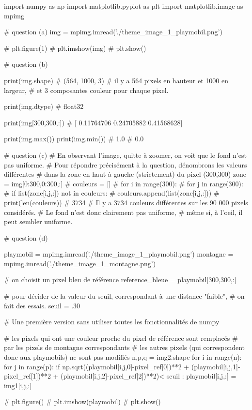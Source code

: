 \documentclass[10pt,fleqn]{article} %
\begin{document}
\begin{multicols}{2}
\begin{corrige}
\begin{python}
import numpy as np
import matplotlib.pyplot as plt
import matplotlib.image as mpimg

# question (a)
img = mpimg.imread('./theme_image_1_playmobil.png')  

# plt.figure(1)
# plt.imshow(img)
# plt.show()

# question (b)

print(img.shape)
# (564, 1000, 3)
# il y a 564 pixels en hauteur et 1000 en largeur,
# et 3 composantes couleur pour chaque pixel.
 
print(img.dtype)
# float32

print(img[300,300,:])
# [ 0.11764706  0.24705882  0.41568628]

print(img.max())
print(img.min())
# 1.0
# 0.0

# question (c)
# En observant l'image, quitte à zoomer, on voit que le fond n'est pas uniforme.
# Pour répondre précisément à la question, dénombrons les valeurs différentes
# dans la zone en haut à gauche (strictement) du pixel (300,300)
zone = img[0:300,0:300,:]
# couleurs = []
# for i in range(300):
#     for j in range(300):
#         if list(zone[i,j,:]) not in couleurs:
#             couleurs.append(list(zone[i,j,:]))
# print(len(couleurs))
# 3734
# Il y a 3734 couleurs différentes sur les 90 000 pixels considérés.
# Le fond n'est donc clairement pas uniforme,
# même si, à l'oeil, il peut sembler uniforme.

# question (d)

playmobil = mpimg.imread('./theme_image_1_playmobil.png')  
montagne = mpimg.imread('./theme_image_1_montagne.png')

# on choisit un pixel bleu de référence
reference_bleue = playmobil[300,300,:]

# pour décider de la valeur du seuil, correspondant à une distance "faible",
# on fait des essais. 
seuil = .30

# Une première version sans utiliser toutes les fonctionnalités de numpy

# les pixels qui ont une couleur proche du pixel de référence sont remplacés
# par les pixels de montagne correspondants
# les autres pixels (qui correspondent donc aux playmobils) ne sont pas modifiés
n,p,q = img2.shape
for i in range(n):
    for j in range(p):
        if np.sqrt((playmobil[i,j,0]-pixel_ref[0])**2 + (playmobil[i,j,1]-pixel_ref[1])**2
                   + (playmobil[i,j,2]-pixel_ref[2])**2)< seuil :
            playmobil[i,j,:] = img1[i,j,:]

# plt.figure()
# plt.imshow(playmobil)
# plt.show()


\end{python}
\end{corrige}
\end{multicols}
\end{document}
